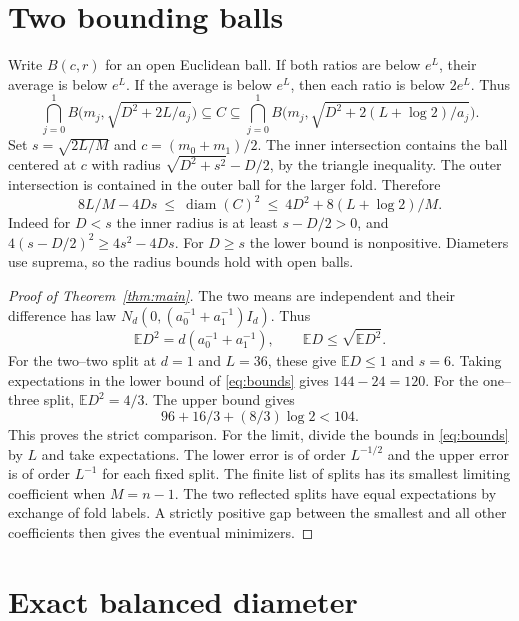 \documentclass[11pt,a4paper]{amsart}
\begin{document}
\section{Two bounding balls}

Write \(B(c,r)\) for an open Euclidean ball. If both ratios are below \(e^L\), their average is below \(e^L\). If the average is below \(e^L\), then each ratio is below \(2e^L\). Thus
\begin{equation}\label{eq:sandwich}
 \bigcap_{j=0}^1 B\bigl(m_j,\sqrt{D^2+2L/a_j}\bigr)
 \subseteq C\subseteq
 \bigcap_{j=0}^1 B\bigl(m_j,\sqrt{D^2+2(L+\log 2)/a_j}\bigr).
\end{equation}
Set \(s=\sqrt{2L/M}\) and \(c=(m_0+m_1)/2\). The inner intersection contains the ball centered at \(c\) with radius \(\sqrt{D^2+s^2}-D/2\), by the triangle inequality. The outer intersection is contained in the outer ball for the larger fold. Therefore
\begin{equation}\label{eq:bounds}
 8L/M-4Ds\ \le\ \operatorname{diam}(C)^2\ \le\ 4D^2+8(L+\log 2)/M.
\end{equation}
Indeed for \(D<s\) the inner radius is at least \(s-D/2>0\), and \(4(s-D/2)^2\ge4s^2-4Ds\). For \(D\ge s\) the lower bound is nonpositive. Diameters use suprema, so the radius bounds hold with open balls.

\begin{proof}[Proof of Theorem~\ref{thm:main}]
The two means are independent and their difference has law \(N_d(0,(a_0^{-1}+a_1^{-1})I_d)\). Thus
\[
 \mathbb E D^2=d(a_0^{-1}+a_1^{-1}),\qquad
 \mathbb E D\le\sqrt{\mathbb E D^2}.
\]
For the two--two split at \(d=1\) and \(L=36\), these give \(\mathbb E D\le1\) and \(s=6\). Taking expectations in the lower bound of \eqref{eq:bounds} gives \(144-24=120\). For the one--three split, \(\mathbb E D^2=4/3\). The upper bound gives
\[
 96+16/3+(8/3)\log 2<104.
\]
This proves the strict comparison. For the limit, divide the bounds in \eqref{eq:bounds} by \(L\) and take expectations. The lower error is of order \(L^{-1/2}\) and the upper error is of order \(L^{-1}\) for each fixed split. The finite list of splits has its smallest limiting coefficient when \(M=n-1\). The two reflected splits have equal expectations by exchange of fold labels. A strictly positive gap between the smallest and all other coefficients then gives the eventual minimizers.
\end{proof}

\section{Exact balanced diameter}
\end{document}
